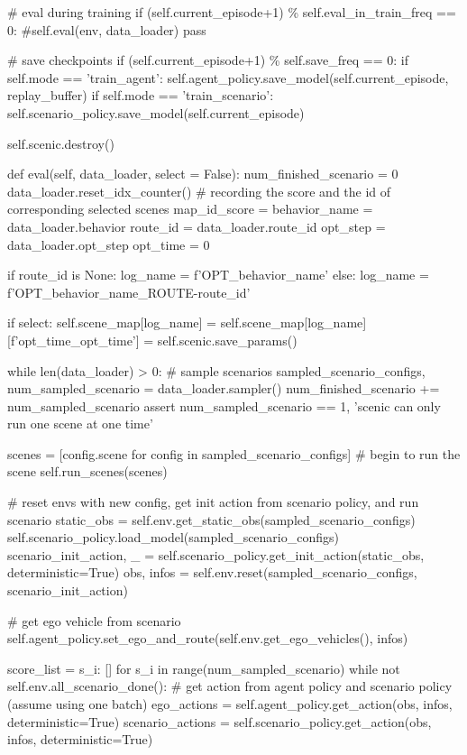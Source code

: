 \begin{appendix}
\# eval during training
if (self.current\_episode+1) \% self.eval\_in\_train\_freq == 0:
\#self.eval(env, data\_loader)
pass

\# save checkpoints
if (self.current\_episode+1) \% self.save\_freq == 0:
if self.mode == 'train\_agent':
self.agent\_policy.save\_model(self.current\_episode, replay\_buffer)
if self.mode == 'train\_scenario':
self.scenario\_policy.save\_model(self.current\_episode)

self.scenic.destroy()

def eval(self, data\_loader, select = False):
num\_finished\_scenario = 0
data\_loader.reset\_idx\_counter()
\# recording the score and the id of corresponding selected scenes
map\_id\_score = {}
behavior\_name = data\_loader.behavior
route\_id = data\_loader.route\_id
opt\_step = data\_loader.opt\_step
opt\_time = 0

if route\_id is None:
log\_name = f'OPT\_{behavior\_name}'
else:
log\_name = f'OPT\_{behavior\_name}\_ROUTE-{route\_id}'

if select:
self.scene\_map[log\_name] = {}
self.scene\_map[log\_name][f'opt\_time\_{opt\_time}'] = self.scenic.save\_params()

while len(data\_loader) > 0:
\# sample scenarios
sampled\_scenario\_configs, num\_sampled\_scenario = data\_loader.sampler()
num\_finished\_scenario += num\_sampled\_scenario
assert num\_sampled\_scenario == 1, 'scenic can only run one scene at one time'

scenes = [config.scene for config in sampled\_scenario\_configs]
\# begin to run the scene
self.run\_scenes(scenes)

\# reset envs with new config, get init action from scenario policy, and run scenario
static\_obs = self.env.get\_static\_obs(sampled\_scenario\_configs)
self.scenario\_policy.load\_model(sampled\_scenario\_configs)
scenario\_init\_action, \_ = self.scenario\_policy.get\_init\_action(static\_obs, deterministic=True)
obs, infos = self.env.reset(sampled\_scenario\_configs, scenario\_init\_action)

\# get ego vehicle from scenario
self.agent\_policy.set\_ego\_and\_route(self.env.get\_ego\_vehicles(), infos)

score\_list = {s\_i: [] for s\_i in range(num\_sampled\_scenario)}
while not self.env.all\_scenario\_done():
\# get action from agent policy and scenario policy (assume using one batch)
ego\_actions = self.agent\_policy.get\_action(obs, infos, deterministic=True)
scenario\_actions = self.scenario\_policy.get\_action(obs, infos, deterministic=True)


\end{appendix}
